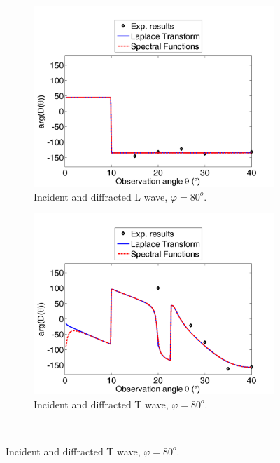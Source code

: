 \begin{figure}[h!]
\centering
    \begin{subfigure}[b]{0.49\textwidth}
        \includegraphics[width=\textwidth]{images/chapter3/Retrodiff_phase_80_L.png}
        \caption{Incident and diffracted L wave, $\varphi=80^o$.}
        \label{C3:DphL80}
    \end{subfigure}
    \begin{subfigure}[b]{0.49\textwidth}
        \includegraphics[width=\textwidth]{images/chapter3/Retrodiff_phase_80_T.png}
        \caption{Incident and diffracted T wave, $\varphi=80^o$.}
        \label{C3:DphT80}
     \end{subfigure} \\  

\end{figure}
